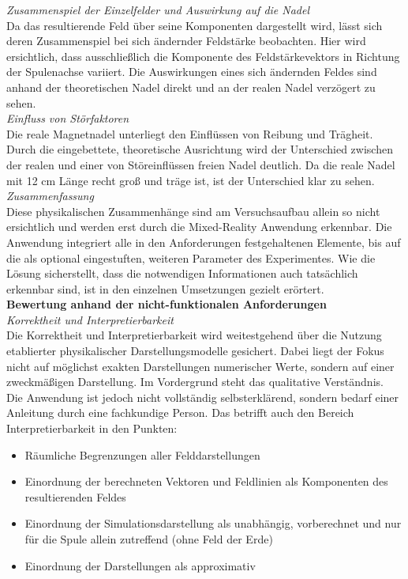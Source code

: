 \textit{Zusammenspiel der Einzelfelder und Auswirkung auf die Nadel}\\
Da das resultierende Feld über seine Komponenten dargestellt wird, lässt sich deren Zusammenspiel bei sich ändernder Feldstärke beobachten. Hier wird ersichtlich, dass ausschließlich die Komponente des Feldstärkevektors in Richtung der Spulenachse variiert. Die Auswirkungen eines sich ändernden Feldes sind anhand der theoretischen Nadel direkt und an der realen Nadel verzögert zu sehen.\\


\textit{Einfluss von Störfaktoren}\\
Die reale Magnetnadel unterliegt den Einflüssen von Reibung und Trägheit. Durch die eingebettete, theoretische Ausrichtung wird der Unterschied zwischen der realen und einer von Störeinflüssen freien Nadel deutlich. Da die reale Nadel mit 12 cm Länge recht groß und träge ist, ist der Unterschied klar zu sehen.\\

\textit{Zusammenfassung}\\
Diese physikalischen Zusammenhänge sind am Versuchsaufbau allein so nicht ersichtlich und werden erst durch die Mixed-Reality Anwendung erkennbar. Die Anwendung integriert alle in den Anforderungen festgehaltenen Elemente, bis auf die als optional eingestuften, weiteren Parameter des Experimentes. Wie die Lösung sicherstellt, dass die notwendigen Informationen auch tatsächlich erkennbar sind, ist in den einzelnen Umsetzungen gezielt erörtert.\\

\textbf{Bewertung anhand der nicht-funktionalen Anforderungen}\\
\textit{Korrektheit und Interpretierbarkeit}\\
Die Korrektheit und Interpretierbarkeit wird weitestgehend über die Nutzung etablierter physikalischer Darstellungsmodelle gesichert. Dabei liegt der Fokus nicht auf möglichst exakten Darstellungen numerischer Werte, sondern auf einer zweckmäßigen Darstellung. Im Vordergrund steht das qualitative Verständnis.\\

Die Anwendung ist jedoch nicht vollständig selbsterklärend, sondern bedarf einer Anleitung durch eine fachkundige Person. Das betrifft auch den Bereich Interpretierbarkeit in den Punkten:
\begin{itemize}
	\setlength{\itemsep}{-1pt}
	\singlespacing
	\item Räumliche Begrenzungen aller Felddarstellungen
	\item Einordnung der berechneten Vektoren und Feldlinien als Komponenten des resultierenden Feldes
	\item Einordnung der Simulationsdarstellung als unabhängig, vorberechnet und nur für die Spule allein zutreffend (ohne Feld der Erde)
	\item Einordnung der Darstellungen als approximativ
\end{itemize}

